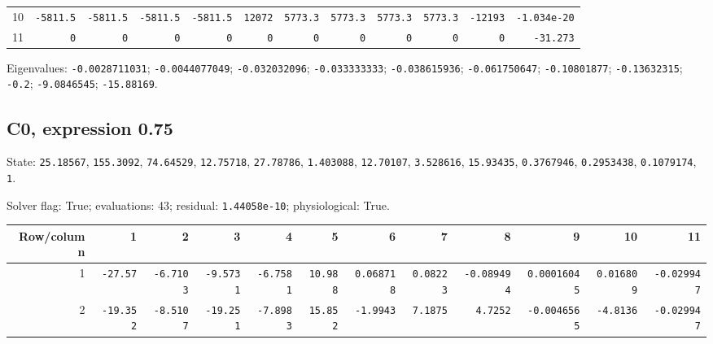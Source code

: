 \begin{landscape}
\begin{tabular}{rrrrrrrrrrrr}
10 & \texttt{-5811.5} & \texttt{-5811.5} & \texttt{-5811.5} & \texttt{-5811.5} & \texttt{12072} & \texttt{5773.3} & \texttt{5773.3} & \texttt{5773.3} & \texttt{5773.3} & \texttt{-12193} & \texttt{-1.034e-20} \\

11 & \texttt{0} & \texttt{0} & \texttt{0} & \texttt{0} & \texttt{0} & \texttt{0} & \texttt{0} & \texttt{0} & \texttt{0} & \texttt{0} & \texttt{-31.273} \\

\bottomrule\end{tabular}\par\endgroup

{\scriptsize Eigenvalues: \texttt{-0.0028711031}; \texttt{-0.0044077049}; \texttt{-0.032032096}; \texttt{-0.033333333}; \texttt{-0.038615936}; \texttt{-0.061750647}; \texttt{-0.10801877}; \texttt{-0.13632315}; \texttt{-0.2}; \texttt{-9.0846545}; \texttt{-15.88169}.\par}

\clearpage
\subsection*{C0, expression 0.75}
{\scriptsize State: \texttt{25.18567}, \texttt{155.3092}, \texttt{74.64529}, \texttt{12.75718}, \texttt{27.78786}, \texttt{1.403088}, \texttt{12.70107}, \texttt{3.528616}, \texttt{15.93435}, \texttt{0.3767946}, \texttt{0.2953438}, \texttt{0.1079174}, \texttt{1}.\par

Solver flag: True; evaluations: 43; residual: \texttt{1.44058e-10}; physiological: True.\par}

\begingroup\scriptsize\setlength{\tabcolsep}{3pt}\centering
\begin{tabular}{rrrrrrrrrrrr}\toprule

Row/column & 1 & 2 & 3 & 4 & 5 & 6 & 7 & 8 & 9 & 10 & 11 \\ \midrule

1 & \texttt{-27.57} & \texttt{-6.7103} & \texttt{-9.5731} & \texttt{-6.7581} & \texttt{10.988} & \texttt{0.068718} & \texttt{0.08223} & \texttt{-0.089494} & \texttt{0.00016045} & \texttt{0.016809} & \texttt{-0.029947} \\

2 & \texttt{-19.352} & \texttt{-8.5107} & \texttt{-19.251} & \texttt{-7.8983} & \texttt{15.852} & \texttt{-1.9943} & \texttt{7.1875} & \texttt{4.7252} & \texttt{-0.0046565} & \texttt{-4.8136} & \texttt{-0.029947} \\


\end{tabular}
\end{landscape}
